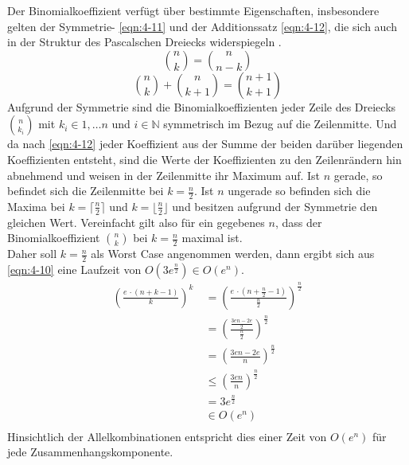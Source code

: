 Der Binomialkoeffizient verfügt über bestimmte Eigenschaften, insbesondere gelten der Symmetrie- \eqref{eqn:4-11} und der Additionssatz \eqref{eqn:4-12}, die sich auch in der Struktur des Pascalschen Dreiecks widerspiegeln \cite{bronst}. 
\begin{equation} \label{eqn:4-11}
\tag{4-11}
\binom{n}{k} = \binom{n}{n - k}
\end{equation} 
\begin{equation} \label{eqn:4-12}
\tag{4-12}
\binom{n}{k} + \binom{n}{k + 1} = \binom{n + 1}{k + 1} 
\end{equation} 
Aufgrund der Symmetrie sind die Binomialkoeffizienten jeder Zeile des Dreiecks $\binom{n}{k_{i}}$ mit $ k_{i} \in 1, \dots n $ und $ i \in \mathds{N} $ symmetrisch im Bezug auf die Zeilenmitte. Und da nach \eqref{eqn:4-12} jeder Koeffizient aus der Summe der beiden darüber liegenden Koeffizienten entsteht, sind die Werte der Koeffizienten zu den Zeilenrändern hin abnehmend und weisen in der Zeilenmitte ihr Maximum auf. Ist $n$ gerade, so befindet sich die Zeilenmitte bei $ k = \frac{n}{2} $. Ist $n$ ungerade so befinden sich die Maxima bei $ k = \lceil \frac{n}{2} \rceil $ und $ k = \lfloor \frac{n}{2} \rfloor $ und besitzen aufgrund der Symmetrie den gleichen Wert. Vereinfacht gilt also für ein gegebenes $n$, dass der Binomialkoeffizient $\binom{n}{k}$ bei $ k = \frac{n}{2} $ maximal ist. \\

Daher soll $ k = \frac{n}{2} $ als Worst Case angenommen werden, dann ergibt sich aus \eqref{eqn:4-10} eine Laufzeit von $ O(3e^{\frac{n}{2}} ) \in O(e^n) $. 
\begin{equation} \label{eqn:4-13}
\tag{4-13}
\begin{aligned}
\left( \frac{e \, \cdotp (n + k - 1)}{k}\right)^k &\ {} = \left( \frac{e \, \cdotp (n + \frac{n}{2} - 1)}{\frac{n}{2}}\right)^{\frac{n}{2}}  \\
&\ = \left( \frac{\frac{3en - 2e}{2}} {\frac{n}{2}}\right)^{\frac{n}{2}} \\
&\ = \left( \frac{3en - 2e}{n}\right)^{\frac{n}{2}} \\
&\ \leq \left( \frac{3en}{n}\right)^{\frac{n}{2}}\\
&\ = 3e^{\frac{n}{2}} \\
&\ \in O(e^n)\\
\end{aligned}
\end{equation}
Hinsichtlich der Allelkombinationen entspricht dies einer Zeit von $ O(e^n) $ für jede Zusammenhangskomponente.  \\


